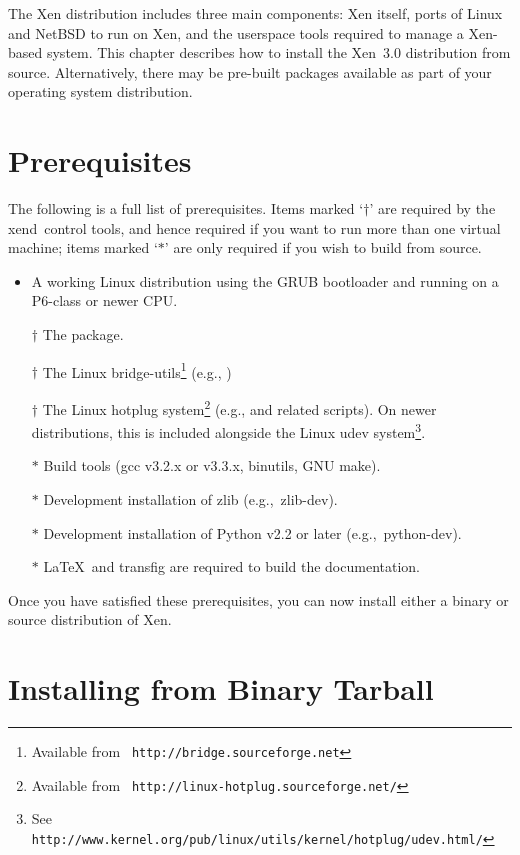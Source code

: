 \documentclass[11pt,twoside,final,openright]{report}
\def\xend{{xend}\xspace}
\begin{document}
The Xen distribution includes three main components: Xen itself, ports
of Linux and NetBSD to run on Xen, and the userspace tools required to
manage a Xen-based system. This chapter describes how to install the
Xen~3.0 distribution from source. Alternatively, there may be pre-built
packages available as part of your operating system distribution.


\section{Prerequisites}
\label{sec:prerequisites}

The following is a full list of prerequisites. Items marked `$\dag$' are
required by the \xend\ control tools, and hence required if you want to
run more than one virtual machine; items marked `$*$' are only required
if you wish to build from source.
\begin{itemize}
\item A working Linux distribution using the GRUB bootloader and running
  on a P6-class or newer CPU\@.
\item [$\dag$] The  package.
\item [$\dag$] The Linux bridge-utils\footnote{Available from {\tt
      http://bridge.sourceforge.net}} (e.g., )
\item [$\dag$] The Linux hotplug system\footnote{Available from {\tt
      http://linux-hotplug.sourceforge.net/}} (e.g.,
       and related scripts).  On newer distributions,
      this is included alongside the Linux udev system\footnote{See {\tt
      http://www.kernel.org/pub/linux/utils/kernel/hotplug/udev.html/}}.
\item [$*$] Build tools (gcc v3.2.x or v3.3.x, binutils, GNU make).
\item [$*$] Development installation of zlib (e.g.,\ zlib-dev).
\item [$*$] Development installation of Python v2.2 or later (e.g.,\
  python-dev).
\item [$*$] \LaTeX\ and transfig are required to build the
  documentation.
\end{itemize}

Once you have satisfied these prerequisites, you can now install either
a binary or source distribution of Xen.

\section{Installing from Binary Tarball}
\end{document}
